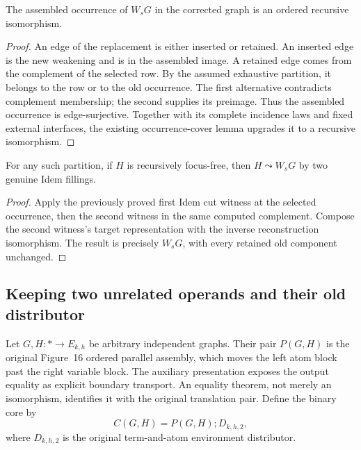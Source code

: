 \begin{lemma}
The assembled occurrence of $W_sG$ in the corrected graph is an ordered
recursive isomorphism.
\end{lemma}
\begin{proof}
An edge of the replacement is either inserted or retained. An inserted edge
is the new weakening and is in the assembled image. A retained edge comes
from the complement of the selected row. By the assumed exhaustive partition,
it belongs to the row or to the old occurrence. The first alternative
contradicts complement membership; the second supplies its preimage.
Thus the assembled occurrence is edge-surjective. Together with its complete
incidence laws and fixed external interfaces, the existing occurrence-cover
lemma upgrades it to a recursive isomorphism.
\end{proof}

\begin{theorem}
For any such partition, if $H$ is recursively focus-free, then
$H\leadsto W_sG$ by two genuine Idem fillings.
\end{theorem}
\begin{proof}
Apply the previously proved first Idem cut witness at the selected occurrence,
then the second witness in the same computed complement. Compose the second
witness's target representation with the inverse reconstruction isomorphism.
The result is precisely $W_sG$, with every retained old component unchanged.
\end{proof}

\subsection{Keeping two unrelated operands and their old distributor}
Let $G,H:*\to E_{k,h}$ be arbitrary independent graphs. Their pair $P(G,H)$
is the original Figure~16 ordered parallel assembly, which moves the left
atom block past the right variable block. The auxiliary presentation exposes
the output equality as explicit boundary transport. An equality theorem,
not merely an isomorphism, identifies it with the original translation pair.
Define the binary core by
\[
        C(G,H)=P(G,H);D_{k,h,2},
\]
where $D_{k,h,2}$ is the original term-and-atom environment distributor.

